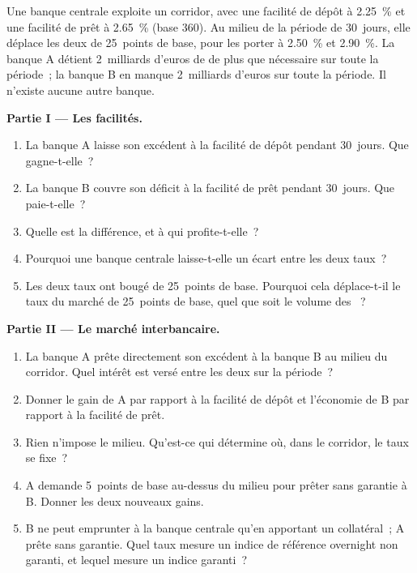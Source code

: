 \begin{problem}\label{pb:m2:central-banks-and-the-short-rate:1}
Une banque centrale exploite un corridor, avec une facilité de dépôt à 2.25~\% et une
facilité de prêt à 2.65~\% (base 360). Au milieu de la période de 30~jours, elle
déplace les deux de 25~points de base, pour les porter à 2.50~\% et 2.90~\%. La banque A
détient 2~milliards d'euros de  de plus que nécessaire sur toute la période~; la banque B
en manque 2~milliards d'euros sur toute la période. Il n'existe aucune autre banque.

\medskip\noindent\textbf{Partie I --- Les facilités.}
\begin{enumerate}
\item La banque A laisse son excédent à la facilité de dépôt pendant 30~jours. Que
gagne-t-elle~?
\item La banque B couvre son déficit à la facilité de prêt pendant 30~jours. Que
paie-t-elle~?
\item Quelle est la différence, et à qui profite-t-elle~?
\item Pourquoi une banque centrale laisse-t-elle un écart entre les deux taux~?
\item Les deux taux ont bougé de 25~points de base. Pourquoi cela déplace-t-il le
taux du marché de 25~points de base, quel que soit le volume des ~?
\end{enumerate}

\medskip\noindent\textbf{Partie II --- Le marché interbancaire.}
\begin{enumerate}[resume]
\item La banque A prête directement son excédent à la banque B au milieu du
corridor. Quel intérêt est versé entre les deux sur la période~?
\item Donner le gain de A par rapport à la facilité de dépôt et l'économie de B
par rapport à la facilité de prêt.
\item Rien n'impose le milieu. Qu'est-ce qui détermine où, dans le corridor, le
taux se fixe~?
\item A demande 5~points de base au-dessus du milieu pour prêter sans garantie à
B. Donner les deux nouveaux gains.
\item B ne peut emprunter à la banque centrale qu'en apportant un collatéral~; A
prête sans garantie. Quel taux mesure un indice de référence overnight non garanti, et lequel
mesure un indice garanti~?
\end{enumerate}


\end{problem}
